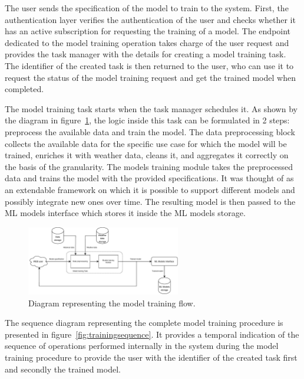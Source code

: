 The user sends the specification of the model to train to the system.
First, the authentication layer verifies the authentication of the user and checks whether it has an active subscription for requesting the training of a model.
The endpoint dedicated to the model training operation takes charge of the user request and provides the task manager with the details for creating a model training task.
The identifier of the created task is then returned to the user, who can use it to request the status of the model training request and get the trained model when completed.

The model training task starts when the task manager schedules it.
As shown by the diagram in figure~\ref{fig:trainingflow}, the logic inside this task can be formulated in 2 steps: preprocess the available data and train the model.
The data preprocessing block collects the available data for the specific use case for which the model will be trained, enriches it with weather data, cleans it, and aggregates it correctly on the basis of the granularity.
The models training module takes the preprocessed data and trains the model with the provided specifications.
It was thought of as an extendable framework on which it is possible to support different models and possibly integrate new ones over time.
The resulting model is then passed to the ML models interface which stores it inside the ML models storage.

\begin{figure}[H]
\centering
\includegraphics[width=0.6\textwidth]{images/architecture_training_flow}
\caption{Diagram representing the model training flow.}
\label{fig:trainingflow}
\end{figure}

The sequence diagram representing the complete model training procedure is presented in figure~\ref{fig:trainingsequence}.
It provides a temporal indication of the sequence of operations performed internally in the system during the model training procedure to provide the user with the identifier of the created task first and secondly the trained model.

